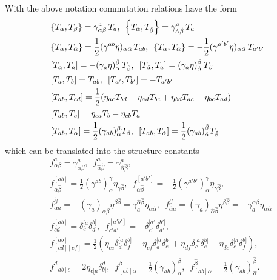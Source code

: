 \documentclass[12pt]{article}
\def\be{\begin{equation}}
\def\ee{\end{equation}}
\numberwithin{equation}{section}
\newcommand{\h}[1]{\hat{#1}}
\begin{document}
With the above notation commutation relations have the form
\be
\begin{aligned}
&	\acomm{T_\alpha}{T_\beta} = \gamma^a_{\alpha \beta} \,T_a, \,\,\, \acomm{T_{\hat{\alpha}}}{T_{\h{\beta}}} = \gamma^a_{\h{\alpha} \h{\beta}} \,T_a \\
& \acomm{T_\alpha}{T_{\h{\alpha}}} = \frac{1}{2} (\gamma^{ab} \eta)_{\alpha \h{\alpha}} \,T_{ab}, \,\,\, \acomm{T_\alpha}{T_{\h{\alpha}}}= -\frac{1}{2} (\gamma^{a'b'} \eta)_{\alpha \h{\alpha}} \, T_{a'b'} \\
& \comm{T_\alpha}{T_a} = -(\gamma_a \eta)_\alpha^{\h{\beta}}\, T_{\h{\beta}}, \,\,\, \comm{T_{\h{\alpha}}}{T_a} = (\gamma_a \eta)_{\h{\alpha}}^{\beta}\, T_{\beta} \\
&\comm{T_a}{T_b} = T_{ab},\,\,\, \comm{T_{a'}}{T_{b'}} = -T_{a'b'} \\
& \comm{T_{ab}}{T_{cd}} = \frac{1}{2}(\eta_{ac} T_{bd} - \eta_{ad} T_{bc} + \eta_{bd} T_{ac} - \eta_{bc} T_{ad}) \\
& \comm{T_{ab}}{T_c} = \eta_{ca} T_b - \eta_{cb} T_a \\
& \comm{T_{ab}}{T_\alpha} = \frac{1}{2}(\gamma_{ab})_\alpha^\beta T_\beta, \,\,\, \comm{T_{ab}}{T_{\h{\alpha}}}= \frac{1}{2}(\gamma_{ab})_{\h{\alpha}}^{\h{\beta}} T_{\h{\beta}}
\label{commut}
\end{aligned}
\ee
which can be translated into the structure constants
\be
\begin{aligned}
	&f_{\alpha \beta}^a = \gamma^a_{\alpha \beta}, \,\,\, f^a_{\hat{\alpha}\hat{\beta}} = \gamma^a_{\h{\alpha}\h{\beta}}, \\
	& f^{[ab]}_{\alpha \h{\beta}} = \frac{1}{2}(\gamma^{ab})_{\alpha}^\gamma \eta_{\gamma \h{\beta}}, \,\,\, f^{[a' b']}_{\alpha \h{\beta}} = - \frac{1}{2}(\gamma^{a' b'})_{\alpha}^\gamma \eta_{\gamma \h{\beta}}, \\
	& f_{\alpha a}^{\h{\beta}} = - (\gamma_a)_{\alpha \beta} \eta^{\beta \h{\beta}} = \gamma_a^{\h{\alpha} \h{\beta}} \eta_{\alpha \h{\alpha}}, \,\,\, f^\beta_{\h{\alpha} a} = (\gamma_a)_{\h{\alpha}\h{\beta}} \eta^{\beta \h{\beta}} = -\gamma_a^{\alpha \beta} \eta_{\alpha \h{\alpha}} \\
	& f^{[ab]}_{cd} = \delta^{[a}_c \delta^{b]}_d, \,\,\, f^{[a'b']}_{c'd'} = -\delta^{[a'}_{c'}\delta^{b']}_{d'}, \\
	& f^{[ab]}_{[cd][ef]} = \frac{1}{2}(\eta_{ce} \delta^{[a}_d \delta^{b]}_f - \eta_{cf} \delta^{[a}_d \delta^{b]}_e + \eta_{df} \delta^{[a}_c \delta^{b]}_e - \eta_{de} \delta^{[a}_c \delta^{b]}_f), \\
	& f^d_{[ab] c} = 2\eta_{c [a} \delta_{b]}^d, \,\,\, f^\beta_{[ab]\alpha} = \frac{1}{2} (\gamma_{ab})_\alpha^\beta, \,\,\, f_{{[ab]}\h{\alpha}}^{\h{\beta}} = \frac{1}{2} (\gamma_{ab})_{\h{\alpha}}^{\h{\beta}}.
	\label{struct}
\end{aligned}
\ee
\end{document}
